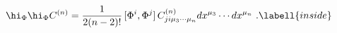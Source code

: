 \begin{equation}
\hi_\Phi\hi_\Phi C^{(n)}={1\over2(n-2)!}\,[\Phi^i,\Phi^j]\,
C^{(n)}_{ji\mu_3\cdots\mu_n}dx^{\mu_3}\cdots dx^{\mu_n}
\ . \labell{inside}
\end{equation}

